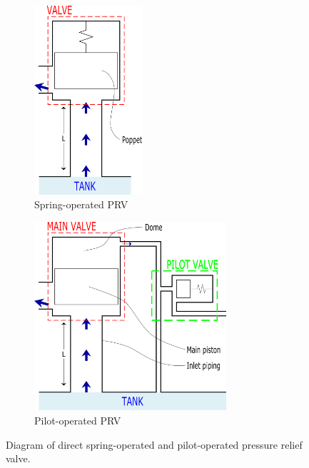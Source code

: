 \begin{figure}[ht]
    \begin{subfigure}{0.4\textwidth}
    \centering
    \includegraphics[height=7cm]{Diagrams/Intro/SpringPRVDiagram.png}
    \caption{Spring-operated PRV}
    \label{fig: IntroSpring}
    \end{subfigure}
    \begin{subfigure}{0.5\textwidth}
    \centering
    \includegraphics[height=7cm]{Diagrams/Intro/PilotPRVDiagram.png}
    \caption{Pilot-operated PRV}
    \label{fig: IntroPilot}
    \end{subfigure}
    \caption{Diagram of direct spring-operated and pilot-operated pressure relief valve.}
    \label{fig: IntroDiagram}
\end{figure}